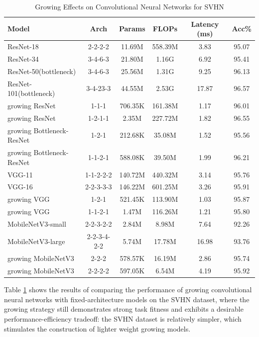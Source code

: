 \documentclass[preprint,12pt]{elsarticle}
\begin{document}
\begin{table}[ht]
\centering
\tiny
\renewcommand{\arraystretch}{1.3}
\begin{adjustbox}{center}
\begin{tabular}{lccccc}
\hline
\textbf{Model} & \textbf{Arch} & \textbf{Params} & \textbf{FLOPs} & \textbf{Latency (ms)} & \textbf{Acc\%} \\
\hline
ResNet-18 & 2-2-2-2 & 11.69M & 558.39M & 3.83 & 95.07 \\
ResNet-34 & 3-4-6-3 & 21.80M & 1.16G & 6.92 & 95.41 \\
ResNet-50(bottleneck) & 3-4-6-3 & 25.56M & 1.31G & 9.25 & 96.13 \\
ResNet-101(bottleneck) & 3-4-23-3 & 44.55M & 2.53G & 17.87 & 96.57 \\
growing ResNet & 1-1-1 & 706.35K & 161.38M & 1.17 & 96.01 \\
growing ResNet & 1-2-1-1 & 2.35M & 227.72M & 1.82 & 96.55 \\
growing Bottleneck-ResNet & 1-2-1 & 212.68K & 35.08M & 1.52 & 95.56 \\
growing Bottleneck-ResNet & 1-1-2-1 & 588.08K & 39.50M & 1.99 & 96.21 \\ \hline
VGG-11 & 1-1-2-2-2 & 140.72M & 440.32M & 3.14 & 95.76 \\
VGG-16 & 2-2-3-3-3 & 146.22M & 601.25M & 3.26 & 95.91 \\
growing VGG & 1-2-1 & 521.45K & 113.90M & 1.03 & 95.87 \\
growing VGG & 1-1-2-1 & 1.47M & 116.26M & 1.21 & 95.80 \\ \hline
MobileNetV3-small & 2-2-3-2-2 & 2.84M & 8.98M & 7.64 & 92.26 \\
MobileNetV3-large & 2-2-3-4-2-2 & 5.74M & 17.78M & 16.98 & 93.76 \\
growing MobileNetV3 & 2-2-2 & 578.57K & 16.19M & 2.86 & 95.74 \\
growing MobileNetV3 & 2-2-2-2 & 597.05K & 6.54M & 4.19 & 95.92 \\
\hline
\end{tabular}
\end{adjustbox}
\caption{Growing Effects on Convolutional Neural Networks for SVHN}
\label{table:svhn_self_growth}
\end{table}

Table \ref{table:svhn_self_growth} shows the results of comparing the performance of growing convolutional neural networks with fixed-architecture models on the SVHN dataset, where the growing strategy still demonstrates strong task fitness and exhibits a desirable performance-efficiency tradeoff: the SVHN dataset is relatively simpler, which stimulates the construction of lighter weight growing models.
\end{document}
